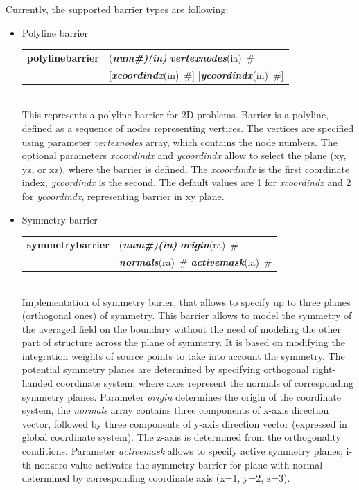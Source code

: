 \documentclass[a4paper]{article}
\makeatletter
\newcommand{\param}[1]{{\em #1}}
\newcommand{\fieldVal}[2]{\mbox{({\it\bf{#1}\#)\tiny (#2)}}}
\newcommand{\keywordnotype}[1]{\mbox{{\it{\bf{#1}}}}}
\newcommand{\keyword}[2]{\mbox{{\keywordnotype{#1}\tiny (#2)}}}
\newcommand{\entKeywordInst}[1]{\mbox{{\bf{{#1}}}}}
\newcommand{\field}[2]{\mbox{\keyword{#1}{#2}~\#}}
\newcommand{\optField}[2]{\mbox{[\field{#1}{#2}]}}
\newenvironment{record}[1][]{\begin{tabular}{|ll}}{\end{tabular}\\}
\newcommand{\recentry}[2]{{#1}&{#2}\\}
\newcounter{rcc}
\newenvironment{record}[1][\textwidth]{\setcounter{rcc}{0}\begin{tabular*}{#1}{|ll@{\extracolsep{\fill}}r}}{\end{tabular*}\\}
\newcommand{\recentry}[2]{\ifthenelse{\value{rcc}>0}{&$\backslash$ \\}{\setcounter{rcc}{1}}{#1}&{#2}}
\makeatother
\begin{document}
Currently, the supported barrier types are following:
\begin{itemize}
\item
  Polyline barrier

  \begin{record}[0.9\textwidth]
    \recentry{\entKeywordInst{polylinebarrier}}{\fieldVal{num}{in} \field{vertexnodes}{ia}}
    \recentry{}{\optField{xcoordindx}{in} \optField{ycoordindx}{in}}
  \end{record}
  This represents a polyline barrier for 2D problems. Barrier is a
polyline, defined as a sequence of nodes representing vertices.
The vertices are specified using parameter \param{vertexnodes} array,
which contains the node numbers. The optional parameters
\param{xcoordindx} and \param{ycoordindx} allow to select the plane
(xy, yz, or xz), where the barrier is defined. The \param{xcoordindx} is the
first coordinate index, \param{ycoordindx} is the second. The default values
are 1 for \param{xcoordindx} and 2 for \param{ycoordindx}, representing barrier in xy plane.
\item Symmetry barrier

\begin{record}[0.9\textwidth]
  \recentry{\entKeywordInst{symmetrybarrier}}{\fieldVal{num}{in} \field{origin}{ra}}
  \recentry{}{\field{normals}{ra} \field{activemask}{ia}}
\end{record}
Implementation of symmetry barier, that allows to specify up to three planes (orthogonal ones) of symmetry.
This barrier allows to  model the symmetry of the averaged field on the boundary without
the need of modeling the other part of structure across the plane of symmetry.
It is based on modifying the integration weights of source points to take into account
the symmetry.
The potential symmetry planes are determined by specifying orthogonal right-handed coordinate system,
where axes represent the normals of corresponding symmetry planes.
Parameter \param{origin} determines the origin of the coordinate system, the \param{normals} array
contains three components of x-axis direction vector,
followed by three components of y-axis direction vector (expressed in global coordinate system).
The z-axis is determined from the orthogonality conditions.
Parameter \param{activemask} allows to specify active symmetry planes; i-th nonzero value activates the symmetry barrier for plane
with normal determined by corresponding coordinate axis (x=1, y=2, z=3).
\end{itemize}
\end{document}
